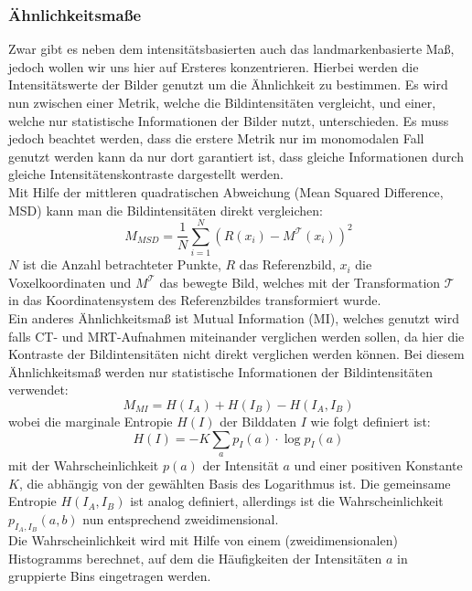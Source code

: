 \subsubsection{Ähnlichkeitsmaße}
Zwar gibt es neben dem intensitätsbasierten auch das landmarkenbasierte Maß,
jedoch wollen wir uns hier auf Ersteres konzentrieren. Hierbei werden die
Intensitätswerte der Bilder genutzt um die Ähnlichkeit zu bestimmen. Es wird
nun zwischen einer Metrik, welche die Bildintensitäten vergleicht, und einer,
welche nur statistische Informationen der Bilder nutzt, unterschieden. Es muss
jedoch beachtet werden, dass die erstere Metrik nur im monomodalen Fall genutzt
werden kann da nur dort garantiert ist, dass gleiche Informationen durch gleiche
Intensitätenskontraste dargestellt werden.\\
Mit Hilfe der mittleren quadratischen Abweichung (Mean Squared Difference, MSD)
kann man die Bildintensitäten direkt vergleichen:
\begin{equation}
  \label{eq:msd}
  M_{MSD}=\frac{1}{N} \sum_{i=1}^N (R(x_i)-M^\mathcal{T}(x_i))^2
\end{equation}
$N$ ist die Anzahl betrachteter Punkte, $R$ das Referenzbild, $x_i$ die
Voxelkoordinaten und $M^\mathcal{T}$ das bewegte Bild, welches mit der
Transformation $\mathcal{T}$ in das Koordinatensystem des Referenzbildes
transformiert wurde.\\
Ein anderes Ähnlichkeitsmaß ist Mutual Information (MI), welches genutzt wird
falls CT- und MRT-Aufnahmen miteinander verglichen werden sollen, da hier die
Kontraste der Bildintensitäten nicht direkt verglichen werden können. Bei
diesem Ähnlichkeitsmaß werden nur statistische Informationen der
Bildintensitäten verwendet:
\begin{equation}
  \label{eq:mi}
  M_{MI}=H(I_A)+H(I_B)-H(I_A,I_B)
\end{equation}
wobei die marginale Entropie $H(I)$ der Bilddaten $I$ wie folgt definiert ist:
\begin{equation}
  \label{eq:mi_h}
  H(I)=-K \sum_a p_I(a) \cdot \log{p_I(a)}
\end{equation}
mit der Wahrscheinlichkeit $p(a)$ der Intensität $a$ und einer positiven
Konstante $K$, die abhängig von der gewählten Basis des Logarithmus ist. Die
gemeinsame Entropie $H(I_A,I_B)$ ist analog definiert, allerdings ist die
Wahrscheinlichkeit $p_{I_A,I_B}(a,b)$ nun entsprechend zweidimensional.\\
Die Wahrscheinlichkeit wird mit Hilfe von einem (zweidimensionalen)
Histogramms berechnet, auf dem die Häufigkeiten der Intensitäten $a$ in
gruppierte Bins eingetragen werden.

